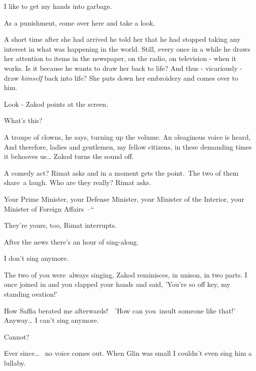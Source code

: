 \documentclass[letterpaper]{article}
\begin{document}
{\textquotedbl}I like to get my hands into garbage.{\textquotedbl} 

{\textquotedbl}As a punishment, come over here and take a look.{\textquotedbl}

A short time after she had arrived he told her that he had stopped taking any interest in what was happening in the
world. Still, every once in a while he draws her attention to items in the newspaper, on the radio, on television -
when it works. Is it because he wants to draw her back to life? And thus - vicariously - draw \textit{himself} back
into life? She puts down her embroidery and comes over to him. 

{\textquotedbl}Look -{\textquotedbl} Zakod points at the screen. 

{\textquotedbl}What's this?{\textquotedbl} 

{\textquotedbl}A troupe of clowns,{\textquotedbl} he says, turning up the volume. An oleaginous voice is heard,
{\textquotedbl}And therefore, ladies and gentlemen, my fellow citizens, in these demanding times it behooves
us{\dots}{\textquotedbl} Zakod turns the sound off. \ 

{\textquotedbl}A comedy act?{\textquotedbl} Rimat asks and in a moment gets the point.~The two of them share~a laugh.
{\textquotedbl}Who are they really?{\textquotedbl} Rimat asks. 

{\textquotedbl}Your Prime Minister, your Defense Minister, your Minister of the Interior, your Minister of Foreign
Affairs\ {}--``

{\textquotedbl}They're yours, too,{\textquotedbl} Rimat interrupts.

{\textquotedbl}After the news there's an hour of sing-along.{\textquotedbl} 

{\textquotedbl}I don't sing anymore.{\textquotedbl} 

{\textquotedbl}The two of you were~always singing,{\textquotedbl} Zakod reminisces, {\textquotedbl}in unison, in two
parts. I once joined in and you clapped your hands and said, 'You're so off key, my standing ovation!'{\textquotedbl} 

{\textquotedbl}How Saffia berated me afterwards!\ \ {}'How can you~insult someone like that!' Anyway{\dots} I can't sing
anymore.{\textquotedbl} 

{\textquotedbl}Cannot?{\textquotedbl} 

{\textquotedbl}Ever since{\dots} ~no voice comes out. When Glin was small I couldn't even sing him a
lullaby.{\textquotedbl} 
\end{document}
